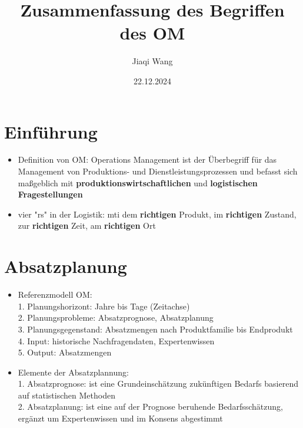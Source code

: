 \documentclass[12pt, letterpaper]{article}
\begin{document}
\begin{CJK*}{UTF8}{gbsn}%

\title{Zusammenfassung des Begriffen des OM}
\author{Jiaqi Wang} %
\date{22.12.2024} %
\maketitle %

\vspace{5cm}

\section{Einführung} %
\begin{itemize}
\item Definition von OM: Operations Management ist der Überbegriff für das Management von Produktions- und Dienstleistungsprozessen und
befasst sich maßgeblich mit \textbf{produktionswirtschaftlichen} und \textbf{logistischen Fragestellungen}

\item vier "rs" in der Logistik: mti dem \textbf{richtigen} Produkt, im \textbf{richtigen} Zustand, zur \textbf{richtigen} Zeit, am \textbf{richtigen} Ort

\end{itemize}


\newpage
{}%

\section{Absatzplanung}

\begin{itemize}
\item Referenzmodell OM:\\
1. Planungshorizont: Jahre bis Tage (Zeitachse)\\
2. Planungsprobleme: Absatzprognose, Absatzplanung\\
3. Planungsgegenstand: Absatzmengen nach Produktfamilie bis Endprodukt\\
4. Input: historische Nachfragendaten, Expertenwissen\\
5. Output: Absatzmengen

\item Elemente der Absatzplannung:\\
1. Absatzprognose: ist eine Grundeinschätzung zukünftigen Bedarfs basierend
auf statistischen Methoden\\
2. Absatzplanung: ist eine auf der Prognose beruhende Bedarfsschätzung,
ergänzt um Expertenwissen und im Konsens abgestimmt\\


\end{itemize}
\end{CJK*}
\end{document}
